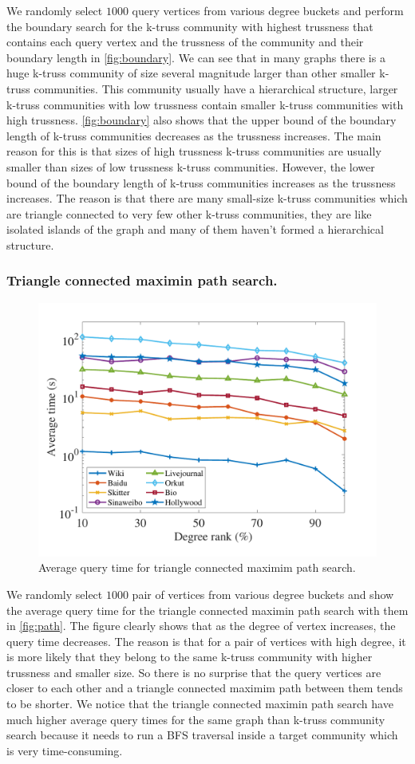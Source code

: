 We randomly select $1000$ query vertices from various degree buckets and perform the boundary search for the k-truss community with highest trussness that contains each query vertex and the trussness of the community and their boundary length in \autoref{fig:boundary}. We can see that in many graphs there is a huge k-truss community of size several magnitude larger than other smaller k-truss communities. This community usually have a hierarchical structure, \ie larger k-truss communities with low trussness contain smaller k-truss communities with high trussness. \autoref{fig:boundary} also shows that the upper bound of the boundary length of k-truss communities decreases as the trussness increases. The main reason for this is that sizes of high trussness k-truss communities are usually smaller than sizes of low trussness k-truss communities. However, the lower bound of the boundary length of k-truss communities increases as the trussness increases. The reason is that there are many small-size k-truss communities which are triangle connected to very few other k-truss communities, \ie they are like isolated islands of the graph and many of them haven't formed a hierarchical structure. 

\subsubsection{Triangle connected maximin path search.}

\begin{figure}[ht]
    \centering
    \includegraphics[width=0.5\linewidth]{./figures/path.pdf}
    \caption{Average query time for triangle connected maximim path search.}
    \label{fig:path}
\end{figure}

We randomly select $1000$ pair of vertices from various degree buckets and show the average query time for the triangle connected maximin path search with them in \autoref{fig:path}. 
The figure clearly shows that as the degree of vertex increases, the query time decreases. The reason is that for a pair of vertices with high degree, it is more likely that they belong to the same k-truss community with higher trussness and smaller size. So there is no surprise that the query vertices are closer to each other and a triangle connected maximim path between them tends to be shorter. We notice that the triangle connected maximin path search have much higher average query times for the same graph than k-truss community search because it needs to run a BFS traversal inside a target community which is very time-consuming.
